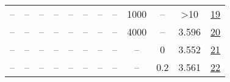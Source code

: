 \begin{table}[H]
\begin{tabular}{cccccccccccc}
-- & -- & -- & -- & -- & -- & -- & -- & 1000 & -- & >10 & \href{https://wandb.ai/stanford-mercury/optimizer-scaling/runs/sweep-130m-2B-mars36f6falr0.016-wd0.1-minlr0-warmup1000-b10.9-b2-2937a8}{19} \\
-- & -- & -- & -- & -- & -- & -- & -- & 4000 & -- & 3.596 & \href{https://wandb.ai/stanford-mercury/optimizer-scaling/runs/sweep-130m-2B-mars15198alr0.016-wd0.1-minlr0-warmup4000-b10.9-b2-b45af5}{20} \\
-- & -- & -- & -- & -- & -- & -- & -- & -- & 0 & 3.552 & \href{https://wandb.ai/stanford-mercury/optimizer-scaling/runs/sweep-130m-2B-mars05131flr0.016-wd0-minlr0-warmup2000-b10.9-b20.-26f8c3}{21} \\
-- & -- & -- & -- & -- & -- & -- & -- & -- & 0.2 & 3.561 & \href{https://wandb.ai/stanford-mercury/optimizer-scaling/runs/sweep-130m-2B-mars17082alr0.016-wd0.2-minlr0-warmup2000-b10.9-b2-0dc23c}{22} \\
\bottomrule
\end{tabular}
\end{table}

